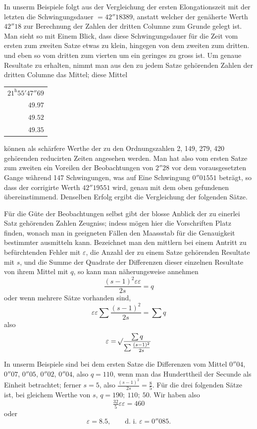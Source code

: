 In unserm Beispiele folgt aus der Vergleichung der ersten Elongationszeit mit der letzten die Schwingungsdauer $=42''18389$, anstatt welcher der genäherte Werth $42''18$ zur Berechnung der Zahlen der dritten Columne zum Grunde gelegt ist. Man sieht so mit Einem Blick, dass diese Schwingungsdauer für die Zeit vom ersten zum zweiten Satze etwas zu klein, hingegen von dem zweiten zum dritten. und eben so vom dritten zum vierten um ein geringes zu gross ist. Um genaue Resultate zu erhalten, nimmt man aus den zu jedem Satze gehörenden Zahlen der dritten Columne das Mittel; diese Mittel
\begin{center}
\begin{tabular}{r}
$21^{\mathrm{h}}55'47''69$\\
$49.97$\\
$49.52$\\
$49.35$
\end{tabular}
\end{center}
können als schärfere Werthe der zu den Ordnungszahlen 2, 149, 279, 420 gehörenden reducirten Zeiten angesehen werden. Man hat also vom ersten Satze zum zweiten ein Voreilen der Beobachtungen von $2''28$ vor dem vorausgesetzten Gange während 147 Schwingungen, was auf Eine Schwingung $0''01551$ beträgt, so dass der corrigirte Werth $42''19551$ wird, genau mit dem oben gefundenen übereinstimmend. Denselben Erfolg ergibt die Vergleichung der folgenden Sätze.

Für die Güte der Beobachtungen selbst gibt der blosse Anblick der zu einerlei Satz gehörenden Zahlen Zeugniss; indess mögen hier die Vorschriften Platz finden, wonach man in geeigneten Fällen den Maassstab für die Genauigkeit bestimmter ausmitteln kann. Bezeichnet man den mittlern bei einem Antritt zu befürchtenden Fehler mit $\varepsilon$, die Anzahl der zu einem Satze gehörenden Resultate mit $s$, und die Summe der Quadrate der Differenzen dieser einzelnen Resultate
von ihrem Mittel mit $q$, so kann man näherungsweise annehmen
\[
\frac{(s-1)^2\varepsilon\varepsilon}{2s}=q
\]
oder wenn mehrere Sätze vorhanden sind,
\[
\varepsilon\varepsilon\sum\frac{(s-1)^2}{2s}=\sum q
\]
also
\[
\varepsilon=\mathord{{}^{}\!\surd}\frac{\sum q}{\sum\frac{(s-1)^2}{2s}}
\]

In unserm Beispiele sind bei dem ersten Satze die Differenzen vom Mittel $0''04$, $0''07$, $0''05$, $0''02$, $0''04$, also $q=110$, wenn man das Hunderttheil der Secunde als Einheit betrachtet; ferner $s=5$, also $\frac{(s-1)^2}{2s}=\frac85$. Für die drei folgenden Sätze ist, bei gleichem Werthe von $s$, $q=190;\ 110;\ 50$. Wir haben also
\[
\tfrac{32}{5}\varepsilon\varepsilon=460
\]
oder
\[
\varepsilon=8.5,\qquad\text{d. i. }\varepsilon=0''085.
\]

